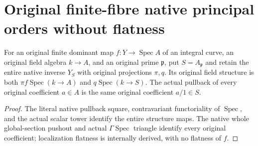 \section{Original finite-fibre native principal orders without flatness}

\begin{definition}
\label{def:fc-finite-fibre-original-coefficient-square}
\leanok
{}
For an original finite dominant map $f:Y\to\operatorname{Spec}A$ of an
integral curve, an original field algebra $k\to A$, and an original prime
$\mathfrak p$, put $S=A_{\mathfrak p}$ and retain the entire native inverse
$Y_S$ with original projections $\pi,q$.  Its original field structure is
both $\pi f\operatorname{Spec}(k\to A)$ and
$q\operatorname{Spec}(k\to S)$.  The actual pullback of every original
coefficient $a\in A$ is the same original coefficient $a/1\in S$.
\end{definition}
\begin{proof}
The literal native pullback square, contravariant functoriality of
$\operatorname{Spec}$, and the actual scalar tower identify the entire
structure maps.  The native whole global-section pushout and actual
$\Gamma\operatorname{Spec}$ triangle identify every original coefficient;
localization flatness is internally derived, with no flatness of $f$.
\end{proof}

